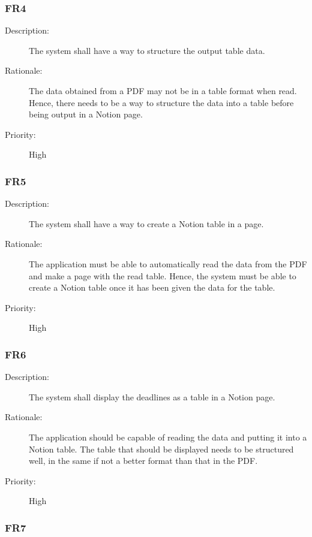 \documentclass[12pt, titlepage]{article}
\begin{document}
\subsubsection{FR4}

\begin{description}
  \item[Description:] The system shall have a way to structure the output table data. 
  \item[Rationale:] The data obtained from a PDF may not be in a table format when read. Hence, there needs to be a way to structure the data into a table before being output in a Notion page. 
  \item[Priority:] High
\end{description}

\subsubsection{FR5}

\begin{description}
  \item[Description:] The system shall have a way to create a Notion table in a page. 
  \item[Rationale:] The application must be able to automatically read the data from the PDF and make a page with the read table. Hence, the system must be able to create a Notion table once it has been given the data for the table. 
  \item[Priority:] High
\end{description}

\subsubsection{FR6}

\begin{description}
  \item[Description:] The system shall display the deadlines as a table in a Notion page. 
  \item[Rationale:] The application should be capable of reading the data and putting it into a Notion table. The table that should be displayed needs to be structured well, in the same if not a better format than that in the PDF. 
  \item[Priority:] High
\end{description}

\subsubsection{FR7}
\end{document}

